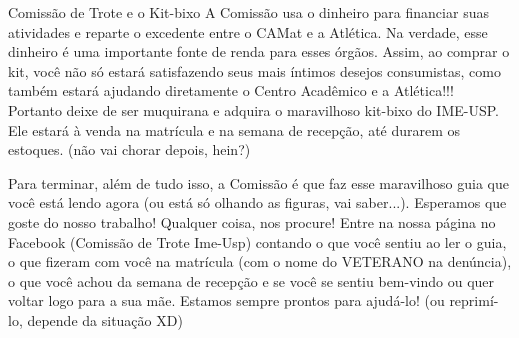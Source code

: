 \begin{secao}{Comissão de Trote e o Kit-bixo}
A Comissão usa o dinheiro para financiar suas atividades e reparte o excedente
entre o CAMat e a Atlética. Na verdade, esse dinheiro é uma importante fonte de
renda para esses órgãos. Assim, ao comprar o kit, você não só estará
satisfazendo seus mais íntimos desejos consumistas, como também estará ajudando
diretamente o Centro Acadêmico e a Atlética!!! Portanto deixe de ser muquirana e
adquira o maravilhoso kit-bixo do IME-USP. Ele estará à venda na matrícula e na
semana de recepção, até durarem os estoques. (não vai chorar depois, hein?)


Para terminar, além de tudo isso, a Comissão é que faz esse maravilhoso guia que
você está lendo agora (ou está só olhando as figuras, vai saber...). Esperamos
que goste do nosso trabalho! Qualquer coisa, nos procure! Entre na nossa página
no Facebook (Comissão de Trote Ime-Usp) contando o que você sentiu ao ler o guia,
o que fizeram com você na matrícula (com o nome do VETERANO na denúncia), o que
você achou da semana de recepção e se você se sentiu bem-vindo ou quer voltar logo
para a sua mãe. Estamos sempre prontos para ajudá-lo! (ou reprimí-lo, depende
da situação XD)

\end{secao}

